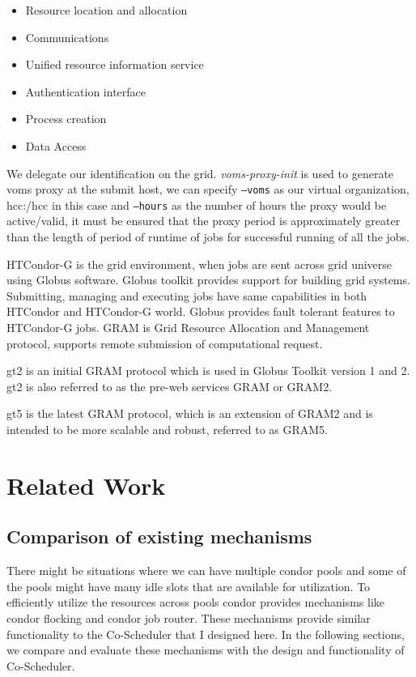 \documentclass[ms,electronic,double]{nuthesis}
\begin{document}
\begin{itemize}
  \item{Resource location and allocation} 
  \item{Communications}
  \item{Unified resource information service}
  \item{Authentication interface}
  \item{Process creation}
  \item{Data Access}
\end{itemize}

We delegate our identification on the grid. \emph{voms-proxy-init}
is used to generate voms proxy at the submit host, we can specify \texttt{--voms} as our 
virtual organization, hcc:/hcc in this case and \texttt{--hours} as the number of hours the proxy would be 
active/valid, it must be ensured that the proxy period is approximately greater than the 
length of period of runtime of jobs for successful running of all the jobs.

HTCondor-G is the grid environment, when jobs are sent across grid universe using 
Globus software. Globus toolkit provides support for building grid systems. 
Submitting, managing and executing jobs have same capabilities in both HTCondor 
and HTCondor-G world. Globus provides fault tolerant features to HTCondor-G 
jobs. GRAM is Grid Resource Allocation and Management protocol, supports remote 
submission of computational request.

gt2 is an initial GRAM protocol which is used in Globus Toolkit version 1 and 
2. gt2 is also referred to as the pre-web services GRAM or GRAM2.

gt5 is the latest GRAM protocol, which is an extension of GRAM2 and is intended 
to be more scalable and robust, referred to as GRAM5.

\chapter{Related Work}

\section{Comparison of existing mechanisms}
There might be situations where we can have multiple condor pools and some of 
the pools might have many idle slots that are available for utilization. To efficiently utilize the resources across pools condor provides 
mechanisms like condor flocking and condor job router. These mechanisms 
provide similar functionality to the Co-Scheduler that I designed here. In the following sections, we compare 
and evaluate these mechanisms with the design and functionality of Co-Scheduler.
\end{document}
